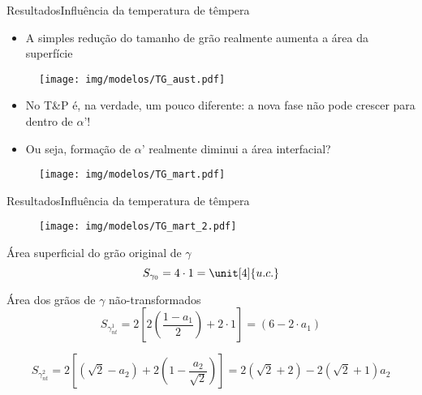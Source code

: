 \begin{frame}{Resultados}{Influência da temperatura de têmpera}
	\begin{itemize}
		\item A simples redução do tamanho de grão realmente aumenta a área da superfície
	\end{itemize}

	\begin{figure}
		\centering
		\texttt{[image: img/modelos/TG\_aust.pdf]}
	\end{figure}

	\begin{itemize}
		\item No T\&P é, na verdade, um pouco diferente: a nova fase não pode crescer para dentro de $\alpha\text{'}$!
		\item Ou seja, formação de $\alpha\text{'}$ realmente diminui a área interfacial?
	\end{itemize}

	\begin{figure}
		\centering
		\texttt{[image: img/modelos/TG\_mart.pdf]}
	\end{figure}
\end{frame}


\begin{frame}{Resultados}{Influência da temperatura de têmpera}
	\begin{figure}
		\centering
		\texttt{[image: img/modelos/TG\_mart\_2.pdf]}
	\end{figure}

	Área superficial do grão original de $\gamma$
	\begin{equation*}
		S_{\gamma_0} = 4\cdot1 = \unit[4]{u.c.}
	\end{equation*}

	Área dos grãos de $\gamma$ não-transformados
	\begin{equation*}
		S_{\gamma_{nt}^1} = 2 \left[ 2 \left(\frac{1-a_1}{2}\right) + 2\cdot1 \right] = (6 - 2\cdot a_1)
	\end{equation*}

	\begin{equation*}
		S_{\gamma_{nt}^2} = 2 \left[ \left( \sqrt{2} - a_2 \right) + 2 \left( 1 - \frac{a_2}{\sqrt{2}} \right) \right] = 2\left(\sqrt{2} + 2\right)  - 2\left(\sqrt{2} + 1\right) a_2
	\end{equation*}
\end{frame}

